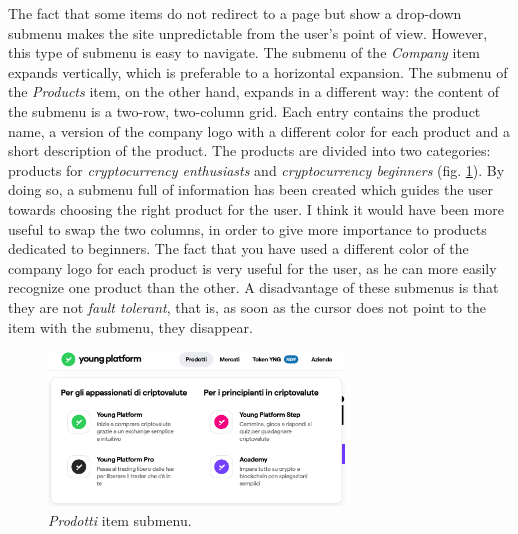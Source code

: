 The fact that some items do not redirect to a page but show a drop-down 
submenu makes the site unpredictable from the user's point of view. 
However, this type of submenu is easy to navigate. The submenu of the 
\textit{Company} item expands vertically, which is preferable to a 
horizontal expansion. The submenu of the \textit{Products} item, on the 
other hand, expands in a different way: the content of the submenu is a 
two-row, two-column grid. Each entry contains the product name, a version 
of the company logo with a different color for each product and a short 
description of the product. The products are divided into two categories: 
products for \textit{cryptocurrency enthusiasts} and 
\textit{cryptocurrency beginners} (fig. \ref{fig:products-submenu}). By 
doing so, a submenu full of information has been created which guides the 
user towards choosing the right product for the user. I think it would have 
been more useful to swap the two columns, in order to give more importance 
to products dedicated to beginners. The fact that you have used a 
different color of the company logo for each product is very useful for 
the user, as he can more easily recognize one product than the other. A 
disadvantage of these submenus is that they are not \textit{fault tolerant}, 
that is, as soon as the cursor does not point to the item with the submenu, 
they disappear.
\begin{figure}[H]
  \centering
  \includegraphics[width=0.70\textwidth]{res/images/products-submenu.png}
  \caption{\textit{Prodotti} item submenu.}
  \label{fig:products-submenu}
\end{figure}